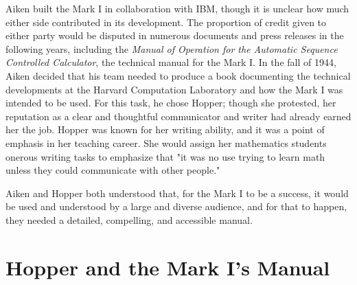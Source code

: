 Aiken built the Mark I in collaboration with IBM, though it is unclear how much either side contributed
in its development.
The proportion of credit given to either party would be disputed in numerous documents and press releases
in the following years, including the
\textit{Manual of Operation for the Automatic Sequence Controlled Calculator},
the technical manual for the Mark I.
In the fall of 1944, Aiken decided that his team needed to produce a book documenting the technical
developments at the Harvard Computation Laboratory and how the Mark I was intended to be used.
For this task, he chose Hopper; though she protested, her reputation as a clear and
thoughtful communicator and writer had already earned her the job.
Hopper was known for her writing ability, and it was a point of emphasis in her teaching career.
She would assign her mathematics students onerous writing tasks to emphasize that
"it was no use trying to learn math unless they could communicate with other people."
\cite[interview on 5 July, 1972]{grace_hopper_and_the_invention_of_the_information_age_2009}

Aiken and Hopper both understood that, for the Mark I to be a success, it would be used and
understood by a large and diverse audience, and for that to happen, they needed a detailed,
compelling, and accessible manual.


\section{Hopper and the Mark I's Manual}

